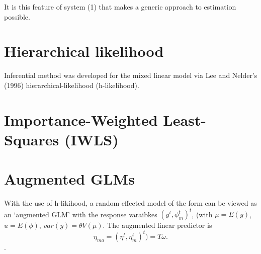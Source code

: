 \documentclass[12pt, a4paper]{article}
\begin{document}
It is this feature of system (1) that makes a generic approach to estimation possible.



\newpage


\section{Hierarchical likelihood} %
Inferential method was developed for the mixed linear model via Lee and Nelder's (1996) hierarchical-likelihood (h-likelihood).

\section{Importance-Weighted Least-Squares (IWLS)}  %







\section{Augmented GLMs} %

With the use of h-likihood, a random effected model of the form can be viewed as an `augmented GLM' with the response varaibkes $(y^t, \phi^t_m)^t$, (with $\mu = E(y)$,$ u = E(\phi)$, $var(y) = \theta V (\mu)$.
The augmented linear predictor is \[\eta_{ma}  = (\eta^t, \eta^t_m)^t) = T\omega. \].

\end{document}
